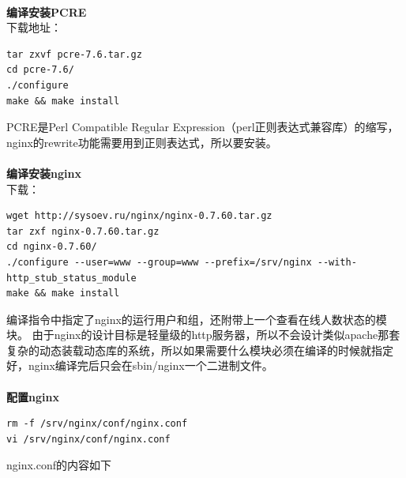 \documentclass{article}
\begin{document}
\paragraph{}\textbf{编译安装PCRE}\\

下载地址：

\begin{verbatim}
tar zxvf pcre-7.6.tar.gz
cd pcre-7.6/
./configure
make && make install 
\end{verbatim}
PCRE是Perl Compatible Regular Expression（perl正则表达式兼容库）的缩写，nginx的rewrite功能需要用到正则表达式，所以要安装。

\paragraph{}\textbf{编译安装nginx}\\

下载：

\begin{verbatim}
wget http://sysoev.ru/nginx/nginx-0.7.60.tar.gz
tar zxf nginx-0.7.60.tar.gz
cd nginx-0.7.60/
./configure --user=www --group=www --prefix=/srv/nginx --with-http_stub_status_module
make && make install 
\end{verbatim}
编译指令中指定了nginx的运行用户和组，还附带上一个查看在线人数状态的模块。
由于nginx的设计目标是轻量级的http服务器，所以不会设计类似apache那套复杂的动态装载动态库的系统，所以如果需要什么模块必须在编译的时候就指定好，nginx编译完后只会在sbin/nginx一个二进制文件。

\paragraph{}\textbf{配置nginx}\\

\begin{verbatim}
rm -f /srv/nginx/conf/nginx.conf
vi /srv/nginx/conf/nginx.conf
\end{verbatim}
nginx.conf的内容如下
\end{document}
